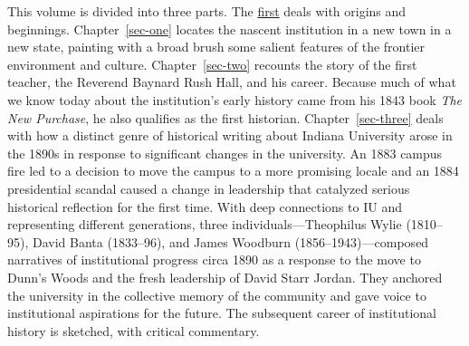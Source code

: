 \documentclass[
  american,
  letterpaper,
]{scrreprt}
\begin{document}

This volume is divided into three parts. The
\hyperref[sec-partone]{first} deals with origins and beginnings.
Chapter~\ref{sec-one} locates the nascent institution in a new town in a
new state, painting with a broad brush some salient features of the
frontier environment and culture. Chapter~\ref{sec-two} recounts the
story of the first teacher, the Reverend Baynard Rush Hall, and his
career. Because much of what we know today about the institution's early
history came from his 1843 book \emph{The New Purchase}, he also
qualifies as the first historian. Chapter~\ref{sec-three} deals with how
a distinct genre of historical writing about Indiana University arose in
the 1890s in response to significant changes in the university. An 1883
campus fire led to a decision to move the campus to a more promising
locale and an 1884 presidential scandal caused a change in leadership
that catalyzed serious historical reflection for the first time. With
deep connections to IU and representing different generations, three
individuals---Theophilus Wylie (1810--95), David Banta (1833--96), and
James Woodburn (1856--1943)---composed narratives of institutional
progress circa 1890 as a response to the move to Dunn's Woods and the
fresh leadership of David Starr Jordan. They anchored the university in
the collective memory of the community and gave voice to institutional
aspirations for the future. The subsequent career of institutional
history is sketched, with critical commentary.
\end{document}
